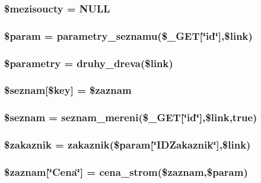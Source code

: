 \subsubsection{\setlength{\rightskip}{0pt plus 5cm}\$mezisoucty = NULL}\label{seznam_8php_487dc80bcdd32233f1326c5baf95e7db}


\subsubsection{\setlength{\rightskip}{0pt plus 5cm}\$param = parametry\_\-seznamu(\$\_\-GET[\char`\"{}id\char`\"{}],\$link)}\label{seznam_8php_efab80aedcdbb988388e43e2f52491f1}


\subsubsection{\setlength{\rightskip}{0pt plus 5cm}\$parametry = druhy\_\-dreva(\$link)}\label{seznam_8php_b97286650a73a4f3f6202b2f66bbcffb}


\subsubsection{\setlength{\rightskip}{0pt plus 5cm}\$seznam[\$key] = \$zaznam}\label{seznam_8php_067e7c23094c43a221e0c09497ffc90a}


\subsubsection{\setlength{\rightskip}{0pt plus 5cm}\$seznam = seznam\_\-mereni(\$\_\-GET[\char`\"{}id\char`\"{}],\$link,true)}\label{seznam_8php_c3380e5da1cd2eb97cefa437bd99bea7}


\subsubsection{\setlength{\rightskip}{0pt plus 5cm}\$zakaznik = zakaznik(\$param[\char`\"{}IDZakaznik\char`\"{}],\$link)}\label{seznam_8php_f532de612998acdb87d5a48bdccfb096}


\subsubsection{\setlength{\rightskip}{0pt plus 5cm}\$zaznam[\char`\"{}Cena\char`\"{}] = cena\_\-strom(\$zaznam,\$param)}\label{seznam_8php_579421ac13d700561fb325c376c523b4}


